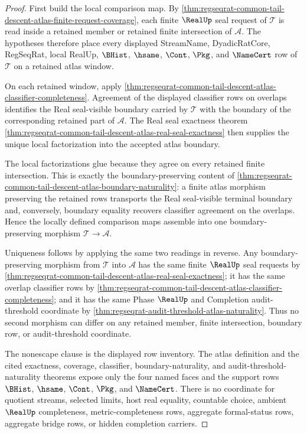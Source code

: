 \begin{proof}
First build the local comparison map. By \autoref{thm:regseqrat-common-tail-descent-atlas-finite-request-coverage}, each finite $\RealUp$ seal request of $\mathcal T$ is read inside a retained member or retained finite intersection of $\mathcal A$. The hypotheses therefore place every displayed StreamName, DyadicRatCore, RegSeqRat, local RealUp, $\BHist$, $\hsame$, $\Cont$, $\Pkg$, and $\NameCert$ row of $\mathcal T$ on a retained atlas window.

On each retained window, apply \autoref{thm:regseqrat-common-tail-descent-atlas-classifier-completeness}. Agreement of the displayed classifier rows on overlaps identifies the Real seal-visible boundary carried by $\mathcal T$ with the boundary of the corresponding retained part of $\mathcal A$. The Real seal exactness theorem \autoref{thm:regseqrat-common-tail-descent-atlas-real-seal-exactness} then supplies the unique local factorization into the accepted atlas boundary.

The local factorizations glue because they agree on every retained finite intersection. This is exactly the boundary-preserving content of \autoref{thm:regseqrat-common-tail-descent-atlas-boundary-naturality}: a finite atlas morphism preserving the retained rows transports the Real seal-visible terminal boundary and, conversely, boundary equality recovers classifier agreement on the overlaps. Hence the locally defined comparison maps assemble into one boundary-preserving morphism $\mathcal T \to \mathcal A$.

Uniqueness follows by applying the same two readings in reverse. Any boundary-preserving morphism from $\mathcal T$ into $\mathcal A$ has the same finite $\RealUp$ seal requests by \autoref{thm:regseqrat-common-tail-descent-atlas-real-seal-exactness}; it has the same overlap classifier rows by \autoref{thm:regseqrat-common-tail-descent-atlas-classifier-completeness}; and it has the same Phase $\RealUp$ and Completion audit-threshold coordinate by \autoref{thm:regseqrat-audit-threshold-atlas-naturality}. Thus no second morphism can differ on any retained member, finite intersection, boundary row, or audit-threshold coordinate.

The nonescape clause is the displayed row inventory. The atlas definition and the cited exactness, coverage, classifier, boundary-naturality, and audit-threshold-naturality theorems expose only the four named faces and the support rows $\BHist$, $\hsame$, $\Cont$, $\Pkg$, and $\NameCert$. There is no coordinate for quotient streams, selected limits, host real equality, countable choice, ambient $\RealUp$ completeness, metric-completeness rows, aggregate formal-status rows, aggregate bridge rows, or hidden completion carriers.
\end{proof}

